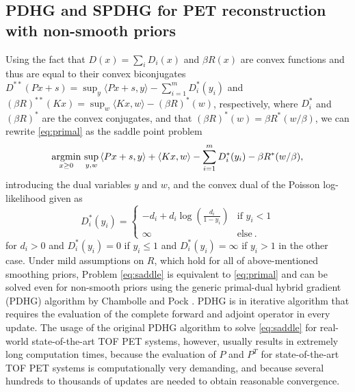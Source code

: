\subsection*{PDHG and SPDHG for PET reconstruction with non-smooth priors}

Using the fact that $D(x) = \sum_i D_i(x)$ and $\beta R(x)$ are convex functions and thus are
equal to their convex biconjugates 
$D^{**}(Px + s) = \sup_y \langle Px + s, y \rangle - \sum_{i=1}^{m} D_i^*(y_i)$ 
and $(\beta R)^{**}(Kx) = \sup_w \langle Kx, w \rangle - (\beta R)^*(w)$, respectively, 
where $D_i^*$ and $(\beta R)^*$ are the convex conjugates,
and that $(\beta R)^*(w) = \beta R^*(w / \beta)$, 
we can rewrite \eqref{eq:primal} as the saddle point problem
%
\begin{equation}
\operatorname*{argmin}_{x\geq 0} \, \sup_{y,w} \,  \langle Px + s, y \rangle + \langle Kx, w \rangle - \sum_{i=1}^{m} D_i^*(y_i) - \beta R^*(w/\beta) ,
\label{eq:saddle}
\end{equation}
%
introducing the dual variables $y$ and $w$, and the convex dual of the Poisson log-likelihood given as
%
\begin{equation}
D_i^*(y_i) =
\begin{cases}
-d_i + d_i \log \left( \frac{d_i}{1-y_i} \right) & \text{if } y_i < 1 \\
\infty & \text{else} \ .
\end{cases}
\end{equation}
for $d_i >0$ and $D_i^*(y_i) = 0$ if $y_i \leq 1$ and $D_i^*(y_i) = \infty$ if $y_i >1$ in the other case.
%
Under mild assumptions on $R$, which hold for all of above-mentioned smoothing priors, Problem \eqref{eq:saddle} is equivalent to \eqref{eq:primal} and
can be solved even for non-smooth priors using the generic primal-dual hybrid gradient (PDHG) 
algorithm by Chambolle and Pock \cite{Chambolle2011}.
PDHG is in iterative algorithm that requires the evaluation of the complete forward and adjoint operator
in every update.
The usage of the original PDHG algorithm to solve \eqref{eq:saddle} for real-world state-of-the-art
TOF PET systems, however, usually results in extremely long computation times, 
because the evaluation of $P$ and $P^T$
for state-of-the-art TOF PET systems is computationally very demanding, and 
because several hundreds to thousands of updates are needed to obtain reasonable convergence.

